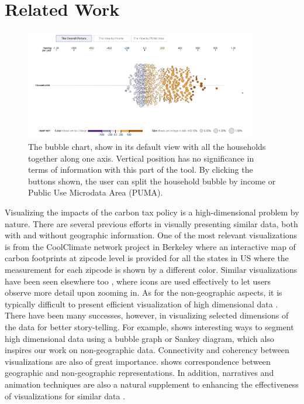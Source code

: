 \documentclass{sigchi}
\begin{document}
\section{Related Work}
\begin{figure}[t]
\centering
\includegraphics[width=0.9\textwidth]{bubbleOverall}
\caption{The bubble chart, show in its default view with all the households together along one axis. Vertical position has no significance in terms of information with this part of the tool. By clicking the buttons shown, the user can split the household bubble by income or Public Use Microdata Area (PUMA).  }
\label{fig:bubbleOverall}
\end{figure}
Visualizing the impacts of the carbon tax policy is a high-dimensional problem by nature. There are several previous efforts in visually presenting similar data, both with and without geographic information. One of the most relevant visualizations is from the CoolClimate network project in Berkeley \cite{coolclimate} where an interactive map of carbon footprints at zipcode level is provided for all the states in US where the measurement for each zipcode is shown by a different color. Similar visualizations have been seen elsewhere too \cite{almanac, powerplant}, where icons are used effectively to let users observe more detail upon zooming in. As for the non-geographic aspects, it is typically difficult to present efficient visualization of high dimensional data \cite{seo2005rank}. There have been many successes, however, in visualizing selected dimensions of the data for better story-telling. For example, \cite{nytimes} shows interesting ways to segment high dimensional data using a bubble graph or Sankey diagram, which also inspires our work on non-geographic data. Connectivity and coherency between visualizations are also of great importance. \cite{nytimes-map} shows correspondence between geographic and non-geographic representations. In addition, narratives and animation techniques are also a natural supplement to enhancing the effectiveness of visualizations for similar data \cite{jheer-animation, jheer-narrative}. 
\end{document}
